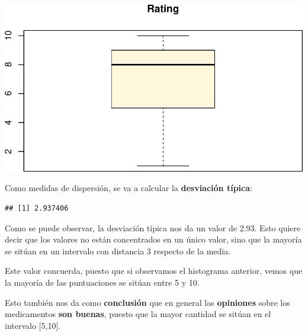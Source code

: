 \documentclass[spanish,]{article}
\newenvironment{Shaded}{\begin{snugshade}}{\end{snugshade}}
\newcommand{\KeywordTok}[1]{\textcolor[rgb]{0.13,0.29,0.53}{\textbf{#1}}}
\newcommand{\DataTypeTok}[1]{\textcolor[rgb]{0.13,0.29,0.53}{#1}}
\newcommand{\StringTok}[1]{\textcolor[rgb]{0.31,0.60,0.02}{#1}}
\newcommand{\CommentTok}[1]{\textcolor[rgb]{0.56,0.35,0.01}{\textit{#1}}}
\newcommand{\OperatorTok}[1]{\textcolor[rgb]{0.81,0.36,0.00}{\textbf{#1}}}
\newcommand{\NormalTok}[1]{#1}
\begin{document}
\begin{Shaded}
\end{Shaded}

\includegraphics{practica-original_files/figure-latex/unnamed-chunk-87-1.pdf}

Como medidas de dispersión, se va a calcular la \textbf{desviación
típica}:

\begin{Shaded}
\end{Shaded}

\begin{verbatim}
## [1] 2.937406
\end{verbatim}

Como se puede observar, la desviación típica nos da un valor de 2.93.
Esto quiere decir que los valores no están concentrados en un único
valor, sino que la mayoría se sitúan en un intervalo con distancia 3
respecto de la media.

Este valor concuerda, puesto que si observamos el histograma anterior,
vemos que la mayoría de las puntuaciones se sitúan entre 5 y 10.

Esto también nos da como \textbf{conclusión} que en general las
\textbf{opiniones} sobre los medicamentos \textbf{son buenas}, puesto
que la mayor cantidad se sitúan en el intervalo {[}5,10{]}.
\end{document}
